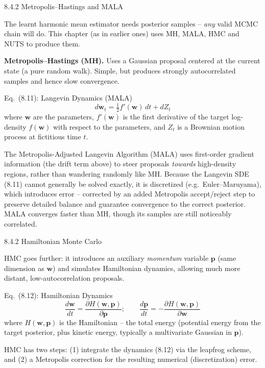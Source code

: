 \documentclass[aspectratio=169,10pt]{beamer}
\begin{document}
\begin{frame}[allowframebreaks]{8.4.2 Metropolis--Hastings and MALA}

The learnt harmonic mean estimator needs posterior samples -- \emph{any} valid MCMC chain will do. This chapter (as in earlier ones) uses MH, MALA, HMC and NUTS to produce them.

\textbf{Metropolis--Hastings (MH).} Uses a Gaussian proposal centered at the current state (a pure random walk). Simple, but produces strongly autocorrelated samples and hence slow convergence.

\begin{block}{Eq.\ (8.11): Langevin Dynamics (MALA)}
\[
d\mathbf{w}_t = \tfrac{1}{2} f'(\mathbf{w})\, dt + dZ_t
\]
where $\mathbf{w}$ are the parameters, $f'(\mathbf{w})$ is the first derivative of the target log-density $f(\mathbf{w})$ with respect to the parameters, and $Z_t$ is a Brownian motion process at fictitious time $t$.
\end{block}

\framebreak

The Metropolis-Adjusted Langevin Algorithm (MALA) uses first-order gradient information (the drift term above) to steer proposals \emph{towards} high-density regions, rather than wandering randomly like MH. Because the Langevin SDE (8.11) cannot generally be solved exactly, it is discretized (e.g.\ Euler--Maruyama), which introduces error -- corrected by an added Metropolis accept/reject step to preserve detailed balance and guarantee convergence to the correct posterior. MALA converges faster than MH, though its samples are still noticeably correlated.

\end{frame}

\begin{frame}[allowframebreaks]{8.4.2 Hamiltonian Monte Carlo}

HMC goes further: it introduces an auxiliary \emph{momentum} variable $\mathbf{p}$ (same dimension as $\mathbf{w}$) and simulates Hamiltonian dynamics, allowing much more distant, low-autocorrelation proposals.

\begin{block}{Eq.\ (8.12): Hamiltonian Dynamics}
\[
\frac{d\mathbf{w}}{dt} = \frac{\partial H(\mathbf{w},\mathbf{p})}{\partial \mathbf{p}}; \qquad
\frac{d\mathbf{p}}{dt} = -\frac{\partial H(\mathbf{w},\mathbf{p})}{\partial \mathbf{w}}
\]
where $H(\mathbf{w},\mathbf{p})$ is the Hamiltonian -- the total energy (potential energy from the target posterior, plus kinetic energy, typically a multivariate Gaussian in $\mathbf{p}$).
\end{block}

HMC has two steps: (1) integrate the dynamics (8.12) via the leapfrog scheme, and (2) a Metropolis correction for the resulting numerical (discretization) error.

\end{frame}
\end{document}
